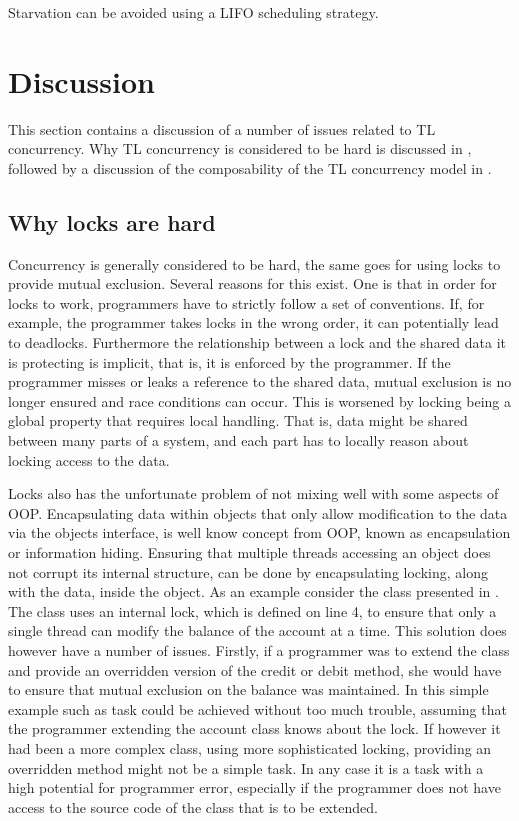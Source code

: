 Starvation can be avoided using a \ac{LIFO} scheduling strategy\cite[p. 459]{tanenbaum2008modern}.

\section{Discussion}
This section contains a discussion of a number of issues related to \ac{TL} concurrency. Why \ac{TL} concurrency is considered to be hard is discussed in , followed by a discussion of the composability of the \ac{TL} concurrency model in .
\subsection{Why locks are hard}\label{subsec:tl_lock_hard}
Concurrency is generally considered to be hard, the same goes for using locks to provide mutual exclusion\cite[p. 56]{sutter2005software}. Several reasons for this exist. One is that in order for locks to work, programmers have to strictly follow a set of conventions. If, for example, the programmer takes locks in the wrong order, it can potentially lead to deadlocks\cite[p. 58]{sutter2005software}. Furthermore the relationship between a lock and the shared data it is protecting is implicit, that is, it is enforced by the programmer. If the programmer misses or leaks a reference to the shared data, mutual exclusion is no longer ensured and race conditions can occur. This is worsened by locking being a global property that requires local handling. That is, data might be shared between many parts of a system, and each part has to locally reason about locking access to the data.

Locks also has the unfortunate problem of not mixing well with some aspects of \ac{OOP}. Encapsulating data within objects that only allow modification to the data via the objects interface, is well know concept from \ac{OOP}, known as encapsulation or information hiding. Ensuring that multiple threads accessing an object does not corrupt its internal structure, can be done by encapsulating locking, along with the data, inside the object. As an example consider the  class presented in . The  class uses an internal lock, which is defined on line 4, to ensure that only a single thread can modify the balance of the account at a time. This solution does however have a number of issues. Firstly, if a programmer was to extend the  class and provide an overridden version of the credit or debit method, she would have to ensure that mutual exclusion on the balance was maintained. In this simple example such as task could be achieved without too much trouble, assuming that the programmer extending the account class knows about the lock. If however it had been a more complex class, using more sophisticated locking, providing an overridden method might not be a simple task. In any case it is a task with a high potential for programmer error, especially if the programmer does not have access to the source code of the class that is to be extended.


